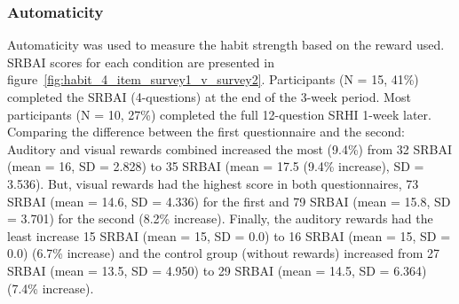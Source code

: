\subsubsection{Automaticity}
Automaticity was used to measure the habit strength based on the reward used. SRBAI scores for each condition are presented in figure~\ref{fig:habit_4_item_survey1_v_survey2}.
Participants (N = 15, 41\%) completed the SRBAI (4-questions) at the end of the 3-week period. Most participants (N = 10, 27\%) completed the full 12-question SRHI 1-week later. Comparing the difference between the first questionnaire and the second: Auditory and visual rewards combined increased the most (9.4\%) from 32 SRBAI (mean = 16, SD = 2.828) to 35 SRBAI (mean = 17.5 (9.4\% increase), SD = 3.536). But, visual rewards had the highest score in both questionnaires, 73 SRBAI (mean = 14.6, SD = 4.336) for the first and 79 SRBAI (mean = 15.8, SD = 3.701) for the second (8.2\% increase). Finally, the auditory rewards had the least increase 15 SRBAI (mean = 15, SD = 0.0) to 16 SRBAI (mean = 15, SD = 0.0) (6.7\% increase) and the control group (without rewards) increased from 27 SRBAI (mean = 13.5, SD = 4.950) to 29 SRBAI (mean = 14.5, SD = 6.364) (7.4\% increase).


